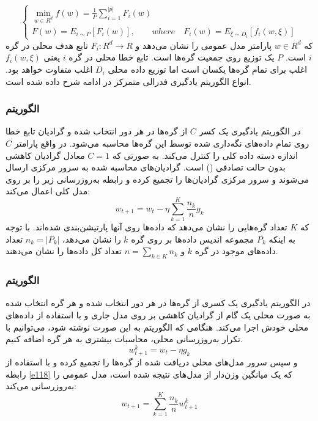 \begin{equation}\label{e115}
	\begin{cases}
		\min_{w\in R^d} f(w)=\frac{1}{P} \sum_{i=1}^{|p|}F_i(w)\\
		F(w)=E_{i\sim P}[F_i(w)], \qquad  where \quad F_i(w)=E_{\xi\sim D_i}[f_i(w,\xi)]
	\end{cases}
\end{equation}
که $w\in R^d$ پارامتر مدل عمومی را نشان می‌دهد و $F_i: R^d\to R$ تابع هدف محلی در گره $i$ است. $P$ یک توزیع روی جمعیت گره‌ها است. تابع خطا محلی در گره $i$ یعنی $f_i(w,\xi)$ اغلب برای تمام گره‌ها یکسان است اما توزیع داده محلی $D_i$ اغلب متفاوت خواهد بود. انواع الگوریتم یادگیری فدرالی متمرکز در ادامه شرح داده شده است.

\subsubsection{الگوریتم }
در الگوریتم یادگیری  یک کسر $C$ از گره‌ها در هر دور انتخاب شده و گرادیان تابع خطا روی تمام داده‌های نگه‌داری شده توسط این گره‌ها محاسبه می‌شود. در واقع پارامتر $C$ اندازه دسته داده کلی را کنترل می‌کند. به صورتی که $C=1$ معادل گرادیان کاهشی  بدون حالت تصادفی () است. گرادیان‌های محاسبه شده به سرور مرکزی ارسال می‌شوند و سرور مرکزی گرادیان‌ها را تجمیع کرده و رابطه به‌روزرسانی زیر را بر روی مدل کلی اعمال می‌کند:
\begin{equation}\label{e116}
	w_{t+1}=w_t-\eta \sum_{k=1}^K \frac{n_k}{n}g_k
\end{equation}
که $K$ تعداد گره‌هایی را نشان می‌دهد که داده‌ها روی آنها پارتیشن‌بندی شده‌اند. با توجه به اینکه $P_k$ مجموعه اندیس داده‌ها بر روی گره $k$ را نشان می‌دهد، $n_k=|P_k|$ تعداد داده‌های موجود در گره $k$ و $n=\sum_{k\in K} n_k$ تعداد کل داده‌ها را نشان می‌دهند. 

\subsubsection{الگوریتم }
در الگوریتم یادگیری  یک کسری از گره‌ها در هر دور انتخاب شده و هر گره انتخاب شده به صورت محلی یک گام از گرادیان کاهشی بر روی مدل جاری و با استفاده از داده‌های محلی خودش اجرا می‌کند. هنگامی که الگوریتم به این صورت نوشته شود، می‌توانیم با تکرار به‌روزرسانی محلی، محاسبات بیشتری به هر گره اضافه کنیم. 
\begin{equation}\label{e117}
	w_{t+1}^k=w_t-\eta g_k
\end{equation}
و سپس سرور مدل‌های محلی دریافت شده از گره‌ها را تجمیع کرده و با استفاده از رابطه \ref{e118} که یک میانگین وزن‌دار از مدل‌های نتیجه شده است، مدل عمومی را به‌روزرسانی می‌کند:
\begin{equation}\label{e118}
	w_{t+1}=\sum_{k=1}^K \frac{n_k}{n}w_{t+1}^k
\end{equation}

